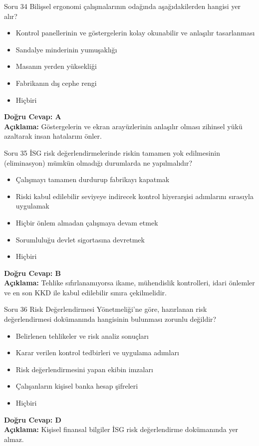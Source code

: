 \documentclass[12pt,a4paper]{article}
\begin{document}
\begin{testcard}{Soru 34}
    Bilişsel ergonomi çalışmalarının odağında aşağıdakilerden hangisi yer alır?
    \begin{itemize}
        \item[A)] Kontrol panellerinin ve göstergelerin kolay okunabilir ve anlaşılır tasarlanması
        \item[B)] Sandalye minderinin yumuşaklığı
        \item[C)] Masanın yerden yüksekliği
        \item[D)] Fabrikanın dış cephe rengi
        \item[E)] Hiçbiri
    \end{itemize}
    \tcblower
    \textbf{Doğru Cevap: A} \\
    \textbf{Açıklama:} Göstergelerin ve ekran arayüzlerinin anlaşılır olması zihinsel yükü azaltarak insan hatalarını önler.
\end{testcard}

\begin{testcard}{Soru 35}
    İSG risk değerlendirmelerinde riskin tamamen yok edilmesinin (eliminasyon) mümkün olmadığı durumlarda ne yapılmalıdır?
    \begin{itemize}
        \item[A)] Çalışmayı tamamen durdurup fabrikayı kapatmak
        \item[B)] Riski kabul edilebilir seviyeye indirecek kontrol hiyerarşisi adımlarını sırasıyla uygulamak
        \item[C)] Hiçbir önlem almadan çalışmaya devam etmek
        \item[D)] Sorumluluğu devlet sigortasına devretmek
        \item[E)] Hiçbiri
    \end{itemize}
    \tcblower
    \textbf{Doğru Cevap: B} \\
    \textbf{Açıklama:} Tehlike sıfırlanamıyorsa ikame, mühendislik kontrolleri, idari önlemler ve en son KKD ile kabul edilebilir sınıra çekilmelidir.
\end{testcard}

\begin{testcard}{Soru 36}
    Risk Değerlendirmesi Yönetmeliği'ne göre, hazırlanan risk değerlendirmesi dokümanında hangisinin bulunması zorunlu değildir?
    \begin{itemize}
        \item[A)] Belirlenen tehlikeler ve risk analiz sonuçları
        \item[B)] Karar verilen kontrol tedbirleri ve uygulama adımları
        \item[C)] Risk değerlendirmesini yapan ekibin imzaları
        \item[D)] Çalışanların kişisel banka hesap şifreleri
        \item[E)] Hiçbiri
    \end{itemize}
    \tcblower
    \textbf{Doğru Cevap: D} \\
    \textbf{Açıklama:} Kişisel finansal bilgiler İSG risk değerlendirme dokümanında yer almaz.
\end{testcard}
\end{document}
